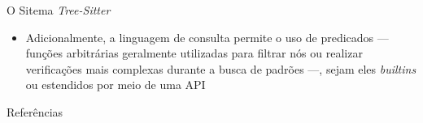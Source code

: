 \documentclass
  [ aspectratio=169,
    english,
    hyperref={citecolor=blue,colorlinks=true,linkcolor=blue,urlcolor=blue},
    brazil]
  {beamer}
\newcommand{\treesitter}{\textit{Tree-Sitter}\xspace}
\begin{document}
  \begin{frame}{O Sitema \treesitter}
    \begin{itemize}
      \item Adicionalmente, a linguagem de consulta permite o uso de predicados
            --- funções arbitrárias geralmente utilizadas para filtrar nós ou
            realizar verificações mais complexas durante a busca de padrões
            ---, sejam eles \textit{builtins} ou estendidos por meio de uma API
    \end{itemize}
  \end{frame}


  \begin{frame}[allowframebreaks]{Referências}\printbibliography\end{frame}
\end{document}
